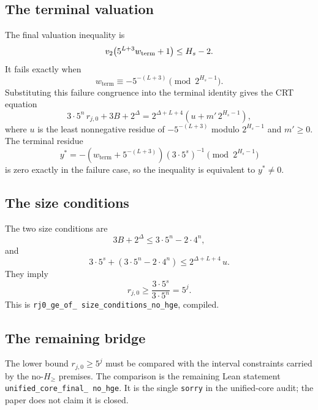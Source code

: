 \subsection{The terminal valuation}

The final valuation inequality is
\begin{equation*}
  v_2\!\left(5^{L+3}w_{\mathrm{term}}+1\right)\le H_s-2.
\end{equation*}
It fails exactly when
\begin{equation*}
  w_{\mathrm{term}}\equiv-5^{-(L+3)}
  \pmod{2^{H_s-1}}.
\end{equation*}
Substituting this failure congruence into the terminal identity gives
the CRT equation
\begin{equation*}
  3\cdot5^n\,r_{j,0}+3B+2^{\Delta}
    =2^{\Delta+L+4}\left(u+m'\,2^{H_s-1}\right),
\end{equation*}
where $u$ is the least nonnegative residue of
$-5^{-(L+3)}$ modulo $2^{H_s-1}$ and $m'\ge0$.  The terminal residue
\begin{equation*}
  y^*=
  -\left(w_{\mathrm{term}}+5^{-(L+3)}\right)
  \left(3\cdot5^s\right)^{-1}
  \pmod{2^{H_s-1}}
\end{equation*}
is zero exactly in the failure case, so the inequality is equivalent
to $y^*\ne0$.

\subsection{The size conditions}

The two size conditions are
\begin{equation*}
  3B+2^{\Delta}\le3\cdot5^n-2\cdot4^n,
\end{equation*}
and
\begin{equation*}
  3\cdot5^s+\left(3\cdot5^n-2\cdot4^n\right)
    \le2^{\Delta+L+4}\,u.
\end{equation*}
They imply
\begin{equation*}
  r_{j,0}\ge\frac{3\cdot5^s}{3\cdot5^n}=5^j.
\end{equation*}
This is \texttt{rj0\_\allowbreak ge\_\allowbreak of\_\allowbreak
size\_\allowbreak conditions\_\allowbreak no\_\allowbreak hge},
compiled.

\subsection{The remaining bridge}

The lower bound $r_{j,0}\ge5^j$ must be compared with the interval
constraints carried by the no-$H_{\ge}$ premises.  The comparison is
the remaining Lean statement
\texttt{unified\_\allowbreak core\_\allowbreak final\_\allowbreak
no\_\allowbreak hge}.  It is the single \texttt{sorry} in the
unified-core audit; the paper does not claim it is closed.


